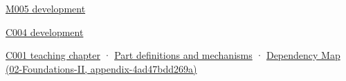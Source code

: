 \href{Continuous\%20Notes/Computing\%20Foundations\%20-\%20From\%20Bits\%20to\%20C++\%20and\%20Systems\%20APIs\#When\%20arithmetic\%20meets\%20uncertainty}{M005 development}

\href{Continuous\%20Notes/Computing\%20Foundations\%20-\%20From\%20Bits\%20to\%20C++\%20and\%20Systems\%20APIs\#A\%20stretching\%20ruler\%20for\%20real-valued\%20quantities}{C004 development}

\href{Continuous\%20Notes/Computing\%20Foundations\%20-\%20From\%20Bits\%20to\%20C++\%20and\%20Systems\%20APIs\#From\%20a\%20signal\%20to\%20an\%20interpretation}{C001 teaching chapter} · \hyperref[appendix-fd090d982a15]{Part definitions and mechanisms} · \href{}{Dependency Map (02-Foundations-II, appendix-4ad47bdd269a)}
